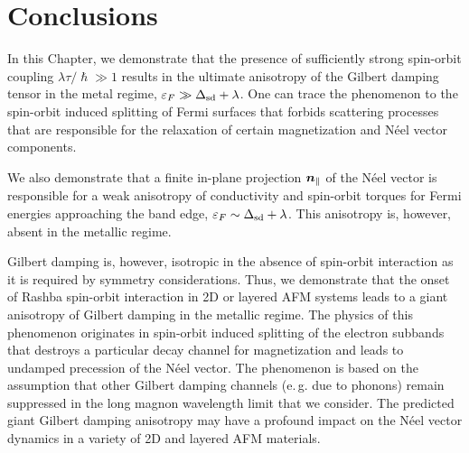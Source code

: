 \section{Conclusions}

In this Chapter, we demonstrate that the presence of sufficiently strong spin-orbit coupling $\lambda\tau/\hslash \gg 1$ results in the ultimate anisotropy of the Gilbert damping tensor in the metal regime, $\varepsilon_F\gg\Delta_{\text{sd}}+\lambda$.  One can trace the phenomenon to the spin-orbit induced splitting of Fermi surfaces that forbids scattering processes that are responsible for the relaxation of certain magnetization and N\'eel vector components. 

We also demonstrate that a finite in-plane projection $\boldsymbol{n}_\parallel$ of the N\'eel vector is responsible for a weak anisotropy of conductivity and spin-orbit torques for Fermi energies approaching the band edge, $\varepsilon_F \sim \Delta_{\text{sd}}+\lambda$. This anisotropy is, however, absent in the metallic regime. 

Gilbert damping is, however, isotropic in the absence of spin-orbit interaction as it is required by symmetry considerations. Thus, we demonstrate that the onset of Rashba spin-orbit interaction in 2D or layered AFM systems leads to a giant anisotropy of Gilbert damping in the metallic regime. The physics of this phenomenon originates in spin-orbit induced splitting of the electron subbands that destroys a particular decay channel for magnetization and leads to undamped precession of the N\'eel vector. The phenomenon is based on the assumption that other Gilbert damping channels  (e.\,g. due to phonons) remain suppressed in the long magnon wavelength limit that we consider. The predicted giant Gilbert damping anisotropy may have a profound impact on the N\'eel vector dynamics in a variety of 2D and layered AFM materials. 




